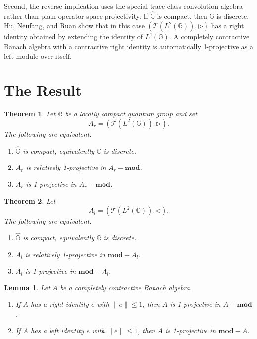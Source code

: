 \documentclass[11pt]{amsart}
\newtheorem{theorem}{Theorem}
\newtheorem{lemma}{Lemma}
\theoremstyle{remark}
\newcommand{\G}{\mathbb G}
\newcommand{\hG}{\widehat{\mathbb G}}
\newcommand{\TC}{\mathcal T}
\newcommand{\opmod}{\mathbf{mod}}
\newcommand{\rhdp}{\triangleright}
\newcommand{\lhdp}{\triangleleft}
\begin{document}
Second, the reverse implication uses the special trace-class convolution algebra rather than plain operator-space projectivity.  If \(\hG\) is compact, then \(\G\) is discrete.  Hu, Neufang, and Ruan show that in this case \((\TC(L^2(\G)),\rhdp)\) has a right identity obtained by extending the identity of \(L^1(\G)\).  A completely contractive Banach algebra with a contractive right identity is automatically 1-projective as a left module over itself.

\section{The Result}

\begin{theorem}\label{t:main-left}
Let \(\G\) be a locally compact quantum group and set
\[
 A_r=(\TC(L^2(\G)),\rhdp).
\]
The following are equivalent.
\begin{enumerate}
\item \(\hG\) is compact, equivalently \(\G\) is discrete.
\item \(A_r\) is relatively 1-projective in \(A_r-\opmod\).
\item \(A_r\) is 1-projective in \(A_r-\opmod\).
\end{enumerate}
\end{theorem}

\begin{theorem}\label{t:main-right}
Let
\[
 A_l=(\TC(L^2(\G)),\lhdp).
\]
The following are equivalent.
\begin{enumerate}
\item \(\hG\) is compact, equivalently \(\G\) is discrete.
\item \(A_l\) is relatively 1-projective in \(\opmod-A_l\).
\item \(A_l\) is 1-projective in \(\opmod-A_l\).
\end{enumerate}
\end{theorem}

\begin{lemma}\label{l:identity-projective}
Let \(A\) be a completely contractive Banach algebra.
\begin{enumerate}
\item If \(A\) has a right identity \(e\) with \(\|e\|\leq1\), then \(A\) is 1-projective in \(A-\opmod\).
\item If \(A\) has a left identity \(e\) with \(\|e\|\leq1\), then \(A\) is 1-projective in \(\opmod-A\).
\end{enumerate}
\end{lemma}
\end{document}
